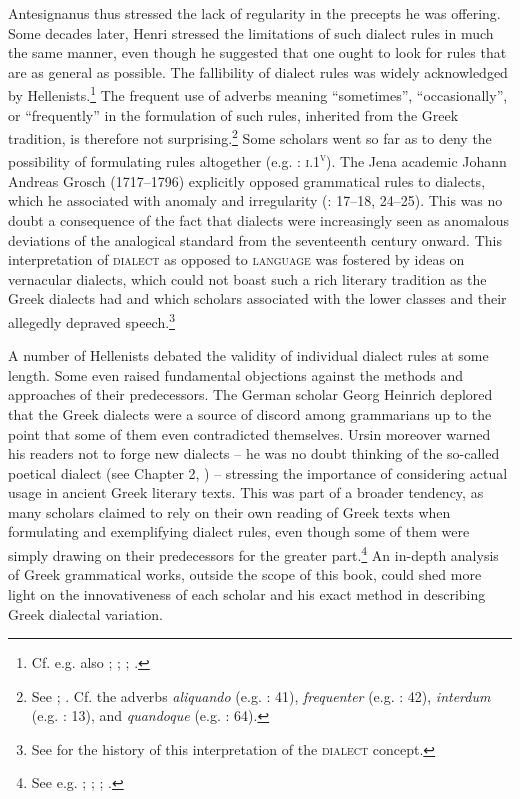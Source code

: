 Antesignanus thus stressed the lack of regularity in the precepts he was offering. Some decades later, Henri \citet[46-47]{Estienne1581} stressed the limitations of such dialect rules in much the same manner, even though he suggested that one ought to look for rules that are as general as possible. The fallibility of dialect rules was widely acknowledged by Hellenists.\footnote{{Cf. e.g. also \citet[38-39]{Schmidt1604}; \citet[2]{Heupel1712}; \citet[1136, 1139]{[frisch]1730}; \citet[299]{Jehne1782}.}} The frequent use of adverbs meaning “sometimes”, “occasionally”, or “frequently” in the formulation of such rules, inherited from the Greek tradition, is therefore not surprising.\footnote{{See \citet[53]{Forstel1999}; \citet[516]{VanRooy2014}. Cf. the adverbs} {\textit{aliquando}} {(e.g. \citealt{Walper1589}: 41),} {\textit{frequenter}} {(e.g. \citealt{Walper1589}: 42),} {\textit{interdum}} {(e.g. \citealt{Antesignanus1554}: 13),}{ }{and} {\textit{quandoque}} {(e.g. \citealt{Walper1589}: 64).}} Some scholars went so far as to deny the possibility of formulating rules altogether (e.g. \citealt{Camden1595}: \textsc{i}.1\textsc{\textsuperscript{v}}). The Jena academic Johann Andreas Grosch (1717–1796) explicitly opposed grammatical rules to dialects, which he associated with anomaly and irregularity (\citealt{Grosch1753}: 17–18, 24–25). This was no doubt a consequence of the fact that dialects were increasingly seen as anomalous deviations of the analogical standard from the seventeenth century onward. This interpretation of \textsc{dialect} as opposed to \textsc{language} was fostered by ideas on vernacular dialects, which could not boast such a rich literary tradition as the Greek dialects had and which scholars associated with the lower classes and their allegedly depraved speech.\footnote{{See \citet[]{VanRooyFcd} for the history of this interpretation of the} {\textsc{dialect}} {concept.}}

A number of Hellenists debated the validity of individual dialect rules at some length. Some even raised fundamental objections against the methods and approaches of their predecessors. The German scholar Georg Heinrich \citet[512]{Ursin1691} deplored that the Greek dialects were a source of discord among grammarians up to the point that some of them even contradicted themselves. Ursin moreover warned his readers not to forge new dialects – he was no doubt thinking of the so-called poetical dialect (see Chapter 2, ) – stressing the importance of considering actual usage in ancient Greek literary texts. This was part of a broader tendency, as many scholars claimed to rely on their own reading of Greek texts when formulating and exemplifying dialect rules, even though some of them were simply drawing on their predecessors for the greater part.\footnote{{See e.g. \citet[†.7\textsc{\textsuperscript{r}}]{Walper1589}; \citet[(.4\textsc{\textsuperscript{r}})]{Portus1603}; \citet[\textsc{\textsuperscript{[a]}}]{Merigon1621}; \citet[b.4\textsc{\textsuperscript{v}}–b.5\textsc{\textsuperscript{r}}, 432]{Nibbe1725}.}}  An in-depth analysis of Greek grammatical works, outside the scope of this book, could shed more light on the innovativeness of each scholar and his exact method in describing Greek dialectal variation.

